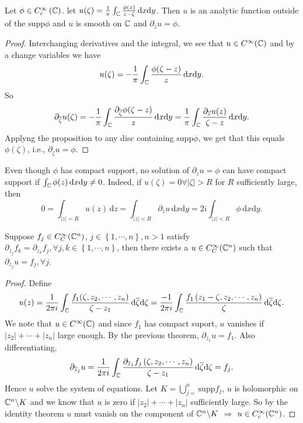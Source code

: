 \begin{theorem}
  Let $\phi \in C^{\infty}_c\left( \mathbb{C} \right) $. let $u(\zeta)=\frac{1}{\pi}\int_{\mathbb{C}}\frac{\phi(z)}{z-\zeta}\,\mathrm{d}x\mathrm{d}y$. Then $u$ is an analytic function outside of the $\mathrm{supp}\phi$ and $u$ is smooth on $\mathbb{C}$ and $\partial_{\overline{z}}u=\phi$.
\end{theorem}
\begin{proof}
  Interchanging derivatives and the integral, we see that $u\in C^{\infty}(\mathbb{C})$ and by a change variables we have
  \[
    u(\zeta)=-\frac{1}{\pi}\int_{\mathbb{C}}\frac{\phi(\zeta-z)}{z}\,\mathrm{d}x\mathrm{d}y.
  \] 
  So \[
    \partial_{\overline{\zeta}}u(\zeta)=-\frac{1}{\pi}\int_{\mathbb{C}}\frac{\partial_{\overline{\zeta}}\phi(\zeta-z)}{z}\,\mathrm{d}x\mathrm{d}y=\frac{1}{\pi}\int_{\mathbb{C}}\frac{\partial_{\overline{z}}u(z)}{\zeta-z}\,\mathrm{d}x\mathrm{d}y.
  \] 
  Applyng the proposition to any disc containing $\mathrm{supp}\phi$, we get that this equals $\phi(\zeta)$, i.e., $\partial_{\overline{\zeta}}u=\phi$.
\end{proof}
\begin{remark}
  Even though $\phi$ has compact support, no solution of $\partial_{\overline{z}}u=\phi$ can have compact support if $\int_{\mathbb{C}}\phi(z)\,\mathrm{d}x\mathrm{d}y\neq 0$. Indeed, if $u(\zeta)=0\forall|\zeta|>R$ for $R$ sufficiently large, then 
  \[
    0=\int_{|z|=R} u(z)\,\mathrm{d}z=\int_{|z|<R}\partial_{\overline{z}}u\,\mathrm{d}x\mathrm{d}y=2i \int_{|z|<R}\phi \, \mathrm{d}x\mathrm{d}y.
  \] 
\end{remark}
\begin{theorem}
  Suppose $f_j\in C_C^{\infty}(\mathbb{C}^{n})$, $ j\in \left\{1,\cdots ,n\right\} ,n>1$ satisfy $\partial_{\overline{z}_j}f_k=\partial_{\overline{z}_k}f_j,\forall j,k \in \left\{1,\cdots ,n\right\} $, then there exists a $u\in C_C^{\infty}(\mathbb{C}^{n})$ such that $\partial_{\overline{z}_j}u=f_j,\forall j$.
\end{theorem}
\begin{proof}
  Define $$u(z)=\frac{1}{2\pi i}\int_{\mathbb{C}} \frac{f_1(\zeta,z_2,\cdots ,z_n)}{\zeta-z_1}\,\mathrm{d} \overline{\zeta} \mathrm{d}\zeta=\frac{-1}{2\pi i}\int_{\mathbb{C}}\frac{f_1\left( z_1-\zeta,z_2,\cdots ,z_n \right) }{\zeta}\, \mathrm{d}\overline{\zeta}\mathrm{d}\zeta.$$
  We note that $u\in C^{\infty}(\mathbb{C})$ and since $f_1$ has compact suport, $u$ vanishes if $|z_2|+\cdots +|z_n|$ large enough.
  By the previous theorem, $\partial_{\overline{z}_1}u=f_1$. Also differentiating, 
  \[
    \partial_{\overline{z}_j}u=\frac{1}{2\pi i}\int_{\mathbb{C}}\frac{\partial_{\overline{z}_1}f_j\left(\zeta,z_2,\cdots ,z_n  \right) }{\zeta-z_1}\,\mathrm{d}\overline{\zeta}\mathrm{d}\zeta=f_j.
  \]
  Hence $u$ solve the system of equations. Let $K=\bigcup_{j=} ^{n}\mathrm{supp}f_j$, $u$ is holomorphic on $\mathbb{C}^{n}\backslash  K$ and we know that $u$ is zero if $|z_2|+\cdots +|z_n|$ sufficiently large. So by the identity theorem $u$ must vanish on the component of $\mathbb{C}^{n}\backslash  K$ $\Rightarrow$ $u\in C_c^{\infty}(\mathbb{C}^{n})$.
\end{proof}

